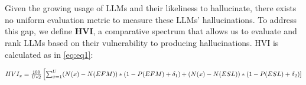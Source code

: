 \vspace{-1mm}
\section{}
\label{sec:hvi}
\vspace{-2mm}
Given the growing usage of LLMs and their likeliness to hallucinate, there exists no uniform evaluation metric to measure these LLMs' hallucinations. To address this gap, we define \textbf{HVI}, a comparative spectrum that allows us to evaluate and rank LLMs based on their vulnerability to producing hallucinations. HVI is calculated as in \cref{eq:eq1}:

\vspace{-8mm}
%

\begin{equation} \nonumber
 \Scale[0.8]{HVI_x = \frac{100}{U*2}\left[ \sum_{x=1}^U(N(x)-N(E F M)) *\left(1-P(E F M)+\delta_1\right)+ \right.} \\
\Scale[0.8]{\left. (N(x)-N(E S L))*\left(1-P(E S L)+\delta_2\right)\right]}
\label{eq:eq1}
\end{equation}

\vspace{-3mm}

